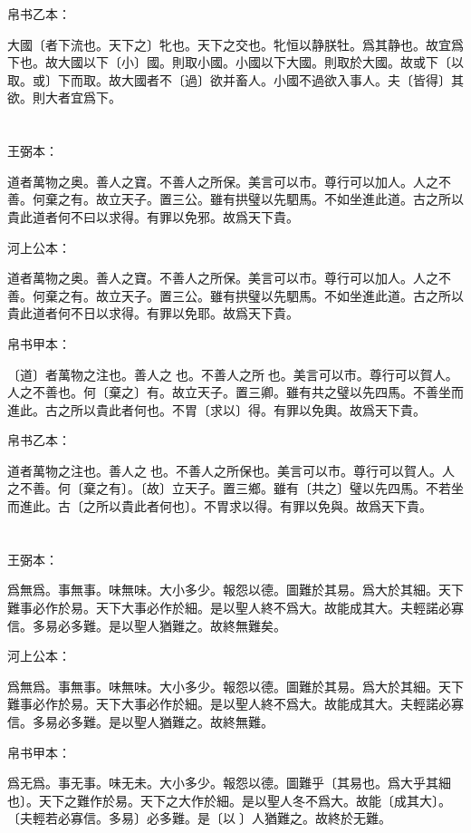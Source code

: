 \documentclass[a5paper]{ctexbook}
\begin{document}
    帛书乙本：

    大國〔者下流也。天下之〕牝也。天下之交也。牝恒以静朕牡。爲其静也。故宜爲下也。故大國以下〔小〕國。則取小國。小國以下大國。則取於大國。故或下〔以取。或〕下而取。故大國者不〔過〕欲并畜人。小國不過欲入事人。夫〔皆得〕其欲。則大者宜爲下。

    \chapter{}
    王弼本：

    道者萬物之奥。善人之寶。不善人之所保。美言可以市。尊行可以加人。人之不善。何棄之有。故立天子。置三公。雖有拱璧以先駟馬。不如坐進此道。古之所以貴此道者何不曰以求得。有罪以免邪。故爲天下貴。

    河上公本：

    道者萬物之奥。善人之寶。不善人之所保。美言可以市。尊行可以加人。人之不善。何棄之有。故立天子。置三公。雖有拱璧以先駟馬。不如坐進此道。古之所以貴此道者何不日以求得。有罪以免耶。故爲天下貴。

    帛书甲本：

    〔道〕者萬物之注也。善人之󱀘也。不善人之所󱀘也。美言可以市。尊行可以賀人。人之不善也。何〔棄之〕有。故立天子。置三卿。雖有共之璧以先四馬。不善坐而進此。古之所以貴此者何也。不胃〔求以〕得。有罪以免輿。故爲天下貴。

    帛书乙本：

    道者萬物之注也。善人之󱀘也。不善人之所保也。美言可以市。尊行可以賀人。人之不善。何〔棄之有〕。〔故〕立天子。置三鄉。雖有〔共之〕璧以先四馬。不若坐而進此。古〔之所以貴此者何也〕。不胃求以得。有罪以免與。故爲天下貴。

    \chapter{}
    王弼本：

    爲無爲。事無事。味無味。大小多少。報怨以德。圖難於其易。爲大於其細。天下難事必作於易。天下大事必作於細。是以聖人終不爲大。故能成其大。夫輕諾必寡信。多易必多難。是以聖人猶難之。故終無難矣。

    河上公本：

    爲無爲。事無事。味無味。大小多少。報怨以德。圖難於其易。爲大於其細。天下難事必作於易。天下大事必作於細。是以聖人終不爲大。故能成其大。夫輕諾必寡信。多易必多難。是以聖人猶難之。故終無難。

    帛书甲本：

    爲无爲。事无事。味无未。大小多少。報怨以德。圖難乎〔其易也。爲大乎其細也〕。天下之難作於易。天下之大作於細。是以聖人冬不爲大。故能〔成其大〕。〔夫輕若必寡信。多易〕必多難。是〔以𦔻〕人猶難之。故終於无難。
\end{document}
